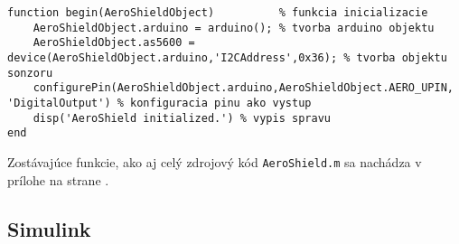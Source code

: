 \begin{lstlisting}[caption={Knižnica AeroShield.m properties.},captionpos=b]
function begin(AeroShieldObject)          % funkcia inicializacie
	AeroShieldObject.arduino = arduino(); % tvorba arduino objektu
	AeroShieldObject.as5600 = device(AeroShieldObject.arduino,'I2CAddress',0x36); % tvorba objektu sonzoru
	configurePin(AeroShieldObject.arduino,AeroShieldObject.AERO_UPIN, 'DigitalOutput') % konfiguracia pinu ako vystup
	disp('AeroShield initialized.') % vypis spravu
end
\end{lstlisting}

Zostávajúce funkcie, ako aj celý zdrojový kód \verb|AeroShield.m| sa nachádza v prílohe na strane \pageref{AeroShield.m}. 

\subsection{Simulink}	